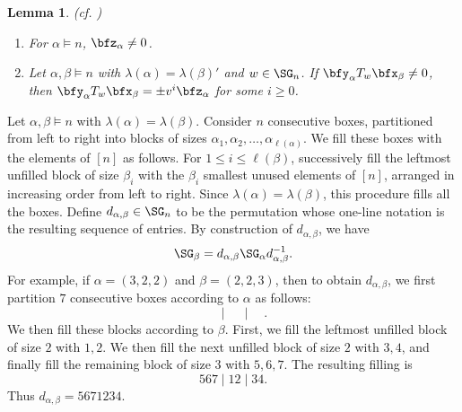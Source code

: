 \documentclass[12pt, reqno]{amsart}
\theoremstyle{plain}
\newtheorem{lemma}[lemma]{Lemma}
\theoremstyle{definition}
\numberwithin{equation}{section}
\numberwithin{figure}{section}
\numberwithin{table}{section}
\begin{document}
\begin{lemma}{\rm(cf. \cite[Lemma 4.1]{86DJ})}\label{lem: Dipper--James}
\begin{enumerate}[label = {\rm (\arabic*)}]
\item For $\alpha \models n$,  $\bfz_{\alpha} \neq 0$.
\item Let $\alpha, \beta \models n$ with $\lambda(\alpha) = \lambda(\beta)'$ and $w \in \SG_n$.
If  $\bfy_\alpha T_w \bfx_\beta \neq 0$, then  
$\bfy_\alpha T_w \bfx_\beta = \pm v^i \bfz_\alpha$ for some $i \ge 0$.
\end{enumerate}
\end{lemma}




Let $\alpha,\beta\models n$ with $\lambda(\alpha) = \lambda(\beta)$. 
Consider $n$ consecutive boxes, partitioned from left to right into blocks of sizes $\alpha_1, \alpha_2, \ldots, \alpha_{\ell(\alpha)}$. 
We fill these boxes with the elements of $[n]$ as follows. 
For $1 \leq i \leq \ell(\beta)$, successively fill the leftmost unfilled block of size $\beta_i$ with the $\beta_i$ smallest unused elements of $[n]$, arranged in increasing order from left to right. Since $\lambda(\alpha)=\lambda(\beta)$, this procedure fills all the boxes. 
Define $d_{\alpha,\beta}\in\SG_n$ to be the permutation whose one-line notation is the resulting sequence of entries.
By construction of $d_{\alpha, \beta}$, we have
\begin{align}\label{eq: conjugation of Young subgrp}
\SG_{\beta} = d_{\alpha, \beta} \SG_{\alpha} d_{\alpha, \beta}^{-1}.
\end{align}
For example, if $\alpha = (3,2,2)$ and $\beta = (2,2,3)$, then to obtain $d_{\alpha, \beta}$, we first partition $7$ consecutive boxes according to $\alpha$ as follows:
\[
\boxed{\phantom{5}} \boxed{\phantom{6}} \boxed{\phantom{7}} \mid \boxed{\phantom{1}} \boxed{\phantom{2}} \mid \boxed{\phantom{3}} \boxed{\phantom{4}}.
\]
We then fill these blocks according to $\beta$. First, we fill the leftmost unfilled block of size $2$ with $1,2$. We then fill the next unfilled block of size $2$ with $3,4$, and finally fill the remaining block of size $3$ with $5,6,7$. The resulting filling is
\[
\boxed{5} \boxed{6} \boxed{7} \mid \boxed{1} \boxed{2} \mid \boxed{3} \boxed{4}.
\]
Thus $d_{\alpha,\beta} = 5671234$.%
\end{document}
